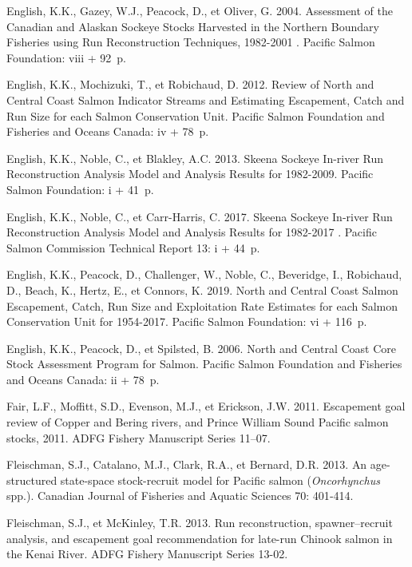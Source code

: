 \documentclass[french,11pt]{book}
\begin{document}
\begin{CSLReferences}{1}{0}
English, K.K., Gazey, W.J., Peacock, D., et Oliver, G. 2004. {Assessment of the Canadian and Alaskan Sockeye Stocks Harvested in the Northern Boundary Fisheries using Run Reconstruction Techniques, 1982-2001 }. Pacific Salmon Foundation: viii + 92~p.

English, K.K., Mochizuki, T., et Robichaud, D. 2012. {Review of North and Central Coast Salmon Indicator Streams and Estimating Escapement, Catch and Run Size for each Salmon Conservation Unit}. {Pacific Salmon Foundation and Fisheries and Oceans Canada}: iv + 78~p.

English, K.K., Noble, C., et Blakley, A.C. 2013. {Skeena Sockeye In-river Run Reconstruction Analysis Model and Analysis Results for 1982-2009}. Pacific Salmon Foundation: i + 41~p.

English, K.K., Noble, C., et Carr-Harris, C. 2017. {Skeena Sockeye In-river Run Reconstruction Analysis Model and Analysis Results for 1982-2017 }. Pacific Salmon Commission Technical Report 13: i + 44~p.

English, K.K., Peacock, D., Challenger, W., Noble, C., Beveridge, I., Robichaud, D., Beach, K., Hertz, E., et Connors, K. 2019. {North and Central Coast Salmon Escapement, Catch, Run Size and Exploitation Rate Estimates for each Salmon Conservation Unit for 1954-2017}. Pacific Salmon Foundation: vi + 116~p.

English, K.K., Peacock, D., et Spilsted, B. 2006. {North and Central Coast Core Stock Assessment Program for Salmon}. {Pacific Salmon Foundation and Fisheries and Oceans Canada}: ii + 78~p.

Fair, L.F., Moffitt, S.D., Evenson, M.J., et Erickson, J.W. 2011. {Escapement goal review of Copper and Bering rivers, and Prince William Sound Pacific salmon stocks, 2011}. ADFG Fishery Manuscript Series 11--07.

Fleischman, S.J., Catalano, M.J., Clark, R.A., et Bernard, D.R. 2013. {An age-structured state-space stock-recruit model for Pacific salmon (}\emph{Oncorhynchus}{ spp.)}. Canadian Journal of Fisheries and Aquatic Sciences 70: 401‑414.

Fleischman, S.J., et McKinley, T.R. 2013. {Run reconstruction, spawner--recruit analysis, and escapement goal recommendation for late-run Chinook salmon in the Kenai River}. ADFG Fishery Manuscript Series 13-02.


\end{CSLReferences}
\end{document}
